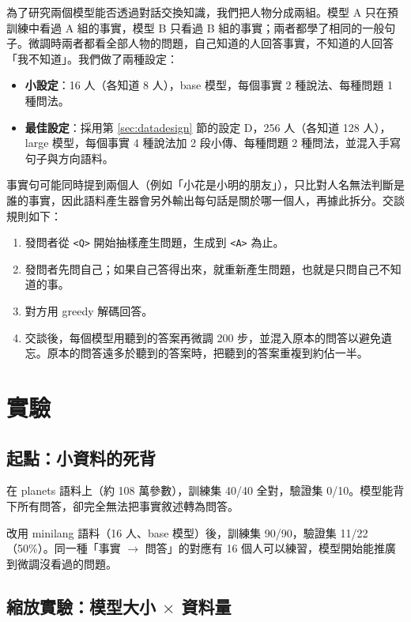 \documentclass[11pt,a4paper]{article}
\newcommand{\tok}[1]{\allowbreak\texttt{<#1>}}
\begin{document}
為了研究兩個模型能否透過對話交換知識，我們把人物分成兩組。模型 A 只在預訓練中看過 A 組的事實，模型 B 只看過 B 組的事實；兩者都學了相同的一般句子。微調時兩者都看全部人物的問題，自己知道的人回答事實，不知道的人回答「我不知道」。我們做了兩種設定：
\begin{itemize}
  \item \textbf{小設定}：16 人（各知道 8 人），base 模型，每個事實 2 種說法、每種問題 1 種問法。
  \item \textbf{最佳設定}：採用第 \ref{sec:datadesign} 節的設定 D，256 人（各知道 128 人），large 模型，每個事實 4 種說法加 2 段小傳、每種問題 2 種問法，並混入手寫句子與方向語料。
\end{itemize}
事實句可能同時提到兩個人（例如「小花是小明的朋友」），只比對人名無法判斷是誰的事實，因此語料產生器會另外輸出每句話是關於哪一個人，再據此拆分。交談規則如下：
\begin{enumerate}
  \item 發問者從 \tok{Q} 開始抽樣產生問題，生成到 \tok{A} 為止。
  \item 發問者先問自己；如果自己答得出來，就重新產生問題，也就是只問自己不知道的事。
  \item 對方用 greedy 解碼回答。
  \item 交談後，每個模型用聽到的答案再微調 200 步，並混入原本的問答以避免遺忘。原本的問答遠多於聽到的答案時，把聽到的答案重複到約佔一半。
\end{enumerate}

\section{實驗}\label{sec:exp}

\subsection{起點：小資料的死背}

在 planets 語料上（約 108 萬參數），訓練集 40/40 全對，驗證集 0/10。模型能背下所有問答，卻完全無法把事實敘述轉為問答。

改用 minilang 語料（16 人、base 模型）後，訓練集 90/90，驗證集 11/22（50\%）。同一種「事實 $\to$ 問答」的對應有 16 個人可以練習，模型開始能推廣到微調沒看過的問題。

\subsection{縮放實驗：模型大小 $\times$ 資料量}
\end{document}
